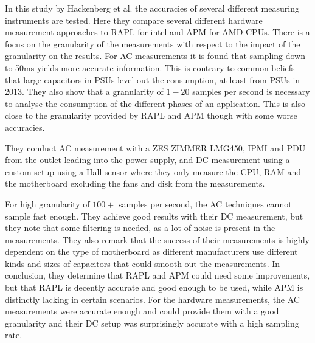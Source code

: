 
In this study by Hackenberg et al.\cite{hackenberg2013} the accuracies of several different measuring instruments are tested. Here they compare several different hardware measurement approaches to RAPL for intel and APM for AMD CPUs. There is a focus on the granularity of the measurements with respect to the impact of the granularity on the results. For AC measurements it is found that sampling down to 50ms yields more accurate information. This is contrary to common beliefs that large capacitors in PSUs level out the consumption, at least from PSUs in 2013. They also show that a granularity of $1-20$ samples per second is necessary to analyse the consumption of the different phases of an application. This is also close to the granularity provided by RAPL and APM though with some worse accuracies.

They conduct AC measurement with a ZES ZIMMER LMG450, IPMI and PDU from the outlet leading into the power supply, and DC measurement using a custom setup using a Hall sensor where they only measure the CPU, RAM and the motherboard excluding the fans and disk from the measurements.

For high granularity of $100+$ samples per second, the AC techniques cannot sample fast enough. They achieve good results with their DC measurement, but they note that some filtering is needed, as a lot of noise is present in the measurements. They also remark that the success of their measurements is highly dependent on the type of motherboard as different manufacturers use different kinds and sizes of capacitors that could smooth out the measurements. In conclusion, they determine that RAPL and APM could need some improvements, but that RAPL is decently accurate and good enough to be used, while APM is distinctly lacking in certain scenarios. For the hardware measurements, the AC measurements were accurate enough and could provide them with a good granularity and their DC setup was surprisingly accurate with a high sampling rate.
